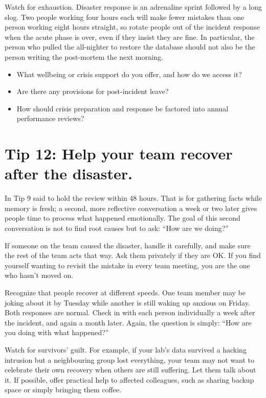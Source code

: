 \documentclass[10pt,letterpaper]{article}
\begin{document}
Watch for exhaustion.  Disaster response is an adrenaline sprint followed by a
long slog.  Two people working four hours each will make fewer mistakes than one
person working eight hours straight, so rotate people out of the incident
response when the acute phase is over, even if they insist they are fine.  In
particular, the person who pulled the all-nighter to restore the database should
not also be the person writing the post-mortem the next morning.

\begin{notebox}
  \begin{itemize}
  \item What wellbeing or crisis support do you offer, and how do we access it?
  \item Are there any provisions for post-incident leave?
  \item How should crisis preparation and response be factored into annual performance reviews?
  \end{itemize}
\end{notebox}

\section*{Tip 12: Help your team recover after the disaster.}

In Tip 9 said to hold the review within 48 hours. That is for gathering facts
while memory is fresh; a second, more reflective conversation a week or two
later gives people time to process what happened emotionally.  The goal of this
second conversation is not to find root causes but to ask: ``How are we doing?''

If someone on the team caused the disaster, handle it carefully, and make sure
the rest of the team acts that way.  Ask them privately if they are OK.  If you
find yourself wanting to revisit the mistake in every team meeting, you are the
one who hasn't moved on.

Recognize that people recover at different speeds.  One team member may be
joking about it by Tuesday while another is still waking up anxious on Friday.
Both responses are normal.  Check in with each person individually a week after
the incident, and again a month later.  Again, the question is simply: ``How are
you doing with what happened?''

Watch for survivors' guilt.  For example, if your lab's data survived a hacking
intrusion but a neighbouring group lost everything, your team may not want to
celebrate their own recovery when others are still suffering.  Let them talk
about it. If possible, offer practical help to affected colleagues, such as
sharing backup space or simply bringing them coffee.
\end{document}
